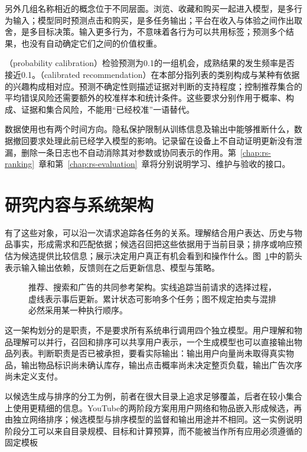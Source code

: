 另外几组名称相近的概念位于不同层面。浏览、收藏和购买一起进入模型，是多行为输入；模型同时预测点击和购买，是多任务输出；平台在收入与体验之间作出取舍，是多目标决策。输入更多行为，不意味着各行为可以共用标签；预测多个结果，也没有自动确定它们之间的价值权重。

（probability calibration）检验预测为0.1的一组机会，成熟结果的发生频率是否接近0.1。（calibrated recommendation）在本部分指列表的类别构成与某种有依据的兴趣构成相对应。预测不确定性则描述证据对判断的支持程度；控制推荐集合的平均错误风险还需要额外的校准样本和统计条件。这些要求分别作用于概率、构成、证据和集合风险，不能用“已经校准”一语替代。

数据使用也有两个时间方向。隐私保护限制从训练信息及输出中能够推断什么，数据撤回要求处理此前已经学入模型的影响。记录留在设备上不自动证明更新没有泄漏，删除一条日志也不自动消除其对参数或协同表示的作用。第~\ref{chap:rs-ranking}~章和第~\ref{chap:rs-evaluation}~章将分别说明学习、维护与验收的接口。

\section{研究内容与系统架构}
\label{sec:rs-architecture}

有了这些对象，可以沿一次请求追踪各任务的关系。理解结合用户表达、历史与物品事实，形成需求和匹配依据；候选召回把这些依据用于当前目录；排序或响应预估为候选提供比较信息；展示决定用户真正有机会看到和操作什么。图~\ref{fig:rs-reference-architecture}中的箭头表示输入输出依赖，反馈则在之后更新信息、模型与策略。

\begin{figure}[htbp]
  \centering
  
  \caption{推荐、搜索和广告的共同参考架构。实线追踪当前请求的选择过程，虚线表示事后更新。累计状态可影响多个任务；图不规定拍卖与混排必然采用某一种执行顺序。}
  \label{fig:rs-reference-architecture}
\end{figure}

这一架构划分的是职责，不是要求所有系统串行调用四个独立模型。用户理解和物品理解可以并行，召回和排序可以共享用户表示，一个生成模型也可以直接输出物品列表。判断职责是否已被承担，要看实际输出：输出用户向量尚未取得真实物品，输出物品标识尚未确认库存，输出点击概率尚未决定整页负载，输出广告次序尚未定义支付。

以候选生成与排序的分工为例，前者在很大目录上追求足够覆盖，后者在较小集合上使用更精细的信息。YouTube的两阶段方案用用户网络和物品嵌入形成候选，再由独立网络排序；候选模型与排序模型的监督和输出用途并不相同。这一实例说明阶段分工可以来自目录规模、目标和计算预算，而不能被当作所有应用必须遵循的固定模板

